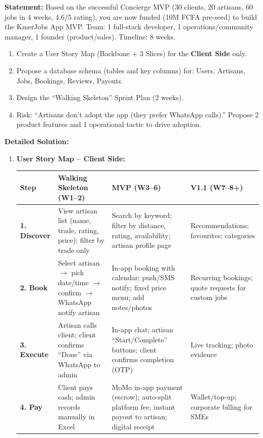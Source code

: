 \documentclass[11pt]{article}
\begin{document}
\begin{exoresolu}
\textbf{Statement:} Based on the successful Concierge MVP (30 clients, 20 artisans, 60 jobs in 4 weeks, 4.6/5 rating), you are now funded (10M FCFA pre-seed) to build the KmerJobs App MVP. Team: 1 full-stack developer, 1 operations/community manager, 1 founder (product/sales). Timeline: 8 weeks.
\begin{enumerate}
    \item Create a User Story Map (Backbone + 3 Slices) for the \textbf{Client Side} only.
    \item Propose a database schema (tables and key columns) for: Users, Artisans, Jobs, Bookings, Reviews, Payouts.
    \item Design the ``Walking Skeleton'' Sprint Plan (2 weeks).
    \item Risk: ``Artisans don't adopt the app (they prefer WhatsApp calls).'' Propose 2 product features and 1 operational tactic to drive adoption.
\end{enumerate}
\tcblower
\textbf{Detailed Solution:}
\begin{enumerate}
    \item \textbf{User Story Map -- Client Side:}
    \begin{center}
    \begin{tabularx}{\linewidth}{|l|X|X|X|}\hline
    \rowcolor{popblueL} \textbf{Step} & \textbf{Walking Skeleton (W1--2)} & \textbf{MVP (W3--6)} & \textbf{V1.1 (W7--8+)} \\ \hline
    \textbf{1. Discover} & View artisan list (name, trade, rating, price); filter by trade only & Search by keyword; filter by distance, rating, availability; artisan profile page & Recommendations; favourites; categories \\ \hline
    \textbf{2. Book} & Select artisan $\to$ pick date/time $\to$ confirm $\to$ WhatsApp notify artisan & In-app booking with calendar; push/SMS notify; fixed price menu; add notes/photos & Recurring bookings; quote requests for custom jobs \\ \hline
    \textbf{3. Execute} & Artisan calls client; client confirms ``Done'' via WhatsApp to admin & In-app chat; artisan ``Start/Complete'' buttons; client confirms completion (OTP) & Live tracking; photo evidence \\ \hline
    \textbf{4. Pay} & Client pays cash; admin records manually in Excel & MoMo in-app payment (escrow); auto-split platform fee; instant payout to artisan; digital receipt & Wallet/top-up; corporate billing for SMEs \\ \hline

\end{tabularx}
\end{center}
\end{enumerate}
\end{exoresolu}
\end{document}
